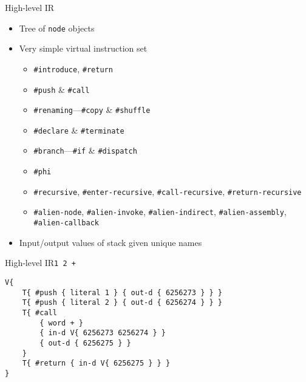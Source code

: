 \documentclass{beamer}
\begin{document}
\begin{frame}{High-level IR}
  \begin{itemize}
    \item Tree of \texttt{node} objects
    \item Very simple virtual instruction set
    \begin{itemize}
      \item \texttt{\#introduce}, \texttt{\#return}
      \item \texttt{\#push} \& \texttt{\#call}
      \item \texttt{\#renaming}---\texttt{\#copy} \& \texttt{\#shuffle}
      \item \texttt{\#declare} \& \texttt{\#terminate}
      \item \texttt{\#branch}---\texttt{\#if} \& \texttt{\#dispatch}
      \item \texttt{\#phi}
      \item \texttt{\#recursive}, \texttt{\#enter-recursive},
            \texttt{\#call-recursive}, \texttt{\#return-recursive}
      \item \texttt{\#alien-node}, \texttt{\#alien-invoke},
            \texttt{\#alien-indirect}, \texttt{\#alien-assembly},
            \texttt{\#alien-callback}
    \end{itemize}
    \item Input/output values of stack given unique names
  \end{itemize}
\end{frame}

\begin{frame}[fragile]{High-level IR}{\texttt{1~2~+}}
  \begin{example}
    \begin{verbatim}
V{
    T{ #push { literal 1 } { out-d { 6256273 } } }
    T{ #push { literal 2 } { out-d { 6256274 } } }
    T{ #call
        { word + }
        { in-d V{ 6256273 6256274 } }
        { out-d { 6256275 } }
    }
    T{ #return { in-d V{ 6256275 } } }
}
    \end{verbatim}
  \end{example}
\end{frame}
\end{document}
